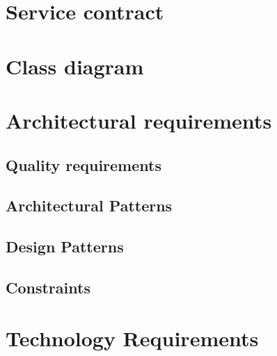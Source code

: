 \documentclass{article}
\begin{document}
	
	\newpage
	
	\section*{Service contract}	
	
	\newpage
	
	\section*{Class diagram}
	
	\newpage
	
	\section*{Architectural requirements}
	
	\subsection*{Quality requirements}	
	\subsection*{Architectural Patterns}	
	\subsection*{Design Patterns}	
	\subsection*{Constraints}	
	
	\newpage
	\section*{Technology Requirements}
	
	
\end{document}
